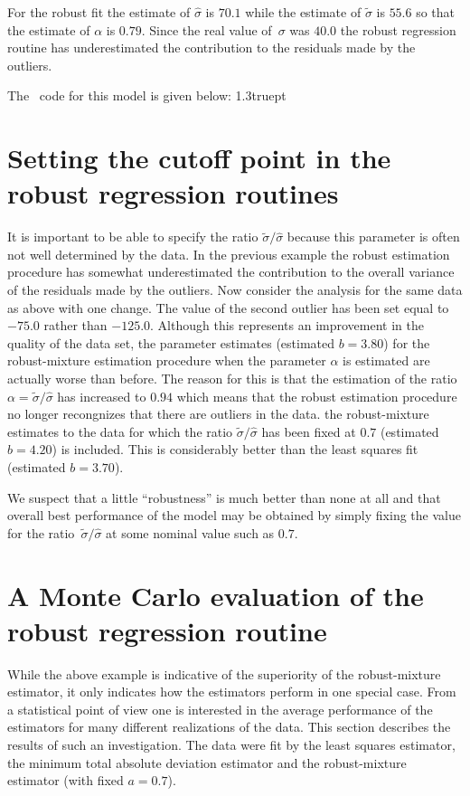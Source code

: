 \documentclass[12pt]{book}
\begin{document}
For the robust fit the estimate of $\hat\sigma$ is $70.1$ while
the estimate of $\tilde\sigma$ is $55.6$ so that the estimate
of $\alpha$ is $0.79$. Since the real value 
of~$\sigma$ was $40.0$ the robust regression routine has underestimated
the contribution to the residuals made by the outliers. 

\goodbreak
The \AD\ code for this model is given below:
\bigskip
{}
\bigbreak
{\openup 1.3truept
\bigbreak
{}
}
\bigbreak

\section{Setting the cutoff point in the robust regression routines}
It is important to be able to specify the ratio $\tilde\sigma/\hat\sigma$
because this parameter is often not well determined by the 
data. In the previous example the robust estimation
procedure has somewhat underestimated the contribution to the overall
variance of the residuals made by the outliers. Now 
consider the analysis for the same data as above with one change.
The value of
the second outlier has been set equal to $-75.0$ rather than $-125.0$.
Although this represents an improvement in the
quality of the data set, the parameter estimates (estimated $b=3.80$)
for the robust-mixture estimation
procedure when the parameter $\alpha$ is estimated are 
actually worse than before. The reason for this is
that the estimation of the ratio $\alpha=\tilde\sigma/\hat\sigma$ has
increased to $0.94$ which means that the robust estimation procedure
no longer recongnizes that there are outliers in the data.  
the robust-mixture estimates to the data for which the 
ratio $\tilde\sigma/\hat\sigma$
has been fixed at $0.7$ (estimated $b=4.20$) is included. 
This  is considerably better than the least squares fit (estimated $b=3.70$).
\goodbreak

\goodbreak

We suspect that a little ``robustness'' is much better 
than none at all and that overall best performance of the 
model may be obtained by simply fixing the value for
 the ratio~$\tilde\sigma/\hat\sigma$ at some nominal value
such as $0.7$.
 

\section{A Monte Carlo evaluation of the robust regression routine}
While the above example is indicative of the superiority of the
robust-mixture estimator, it only indicates how the
estimators perform in one special case. From a statistical point of
view one is interested in the average performance of
the estimators for many different realizations of the data.
This section describes the results of such an investigation.
The data were fit by the least squares estimator, the minimum total
absolute deviation estimator and the robust-mixture estimator
(with fixed $a=0.7$). 
\end{document}
